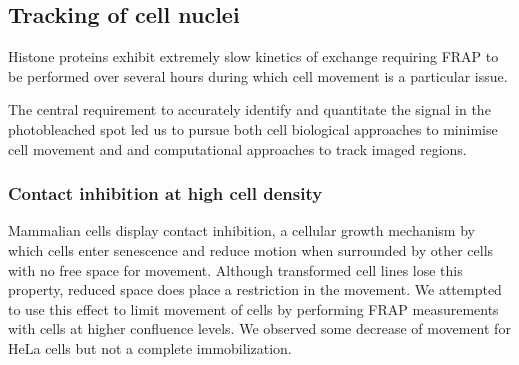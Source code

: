   \subsection{Tracking of cell nuclei}


    Histone proteins exhibit extremely slow kinetics of exchange
	requiring FRAP to be performed over several hours during which cell movement is
    a particular issue. %

	
    The central requirement to accurately identify and quantitate the signal 
	in the photobleached spot led us to pursue both cell biological approaches to
	minimise cell movement and and computational approaches to track imaged regions.

    \subsubsection{Contact inhibition at high cell density}

      Mammalian cells display contact inhibition, 
	  a cellular growth mechanism by which cells enter senescence and reduce motion 
	  when surrounded by other cells with no free space for movement. 
      Although transformed cell lines lose this property, 
	  reduced space does place a restriction in the movement.
	  We attempted to use this effect to limit movement of cells
      by performing FRAP measurements with cells at higher confluence levels.
	  We observed some decrease of movement for HeLa cells but not a complete immobilization.

